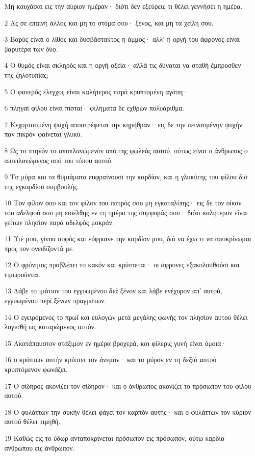 \par Μη καυχάσαι εις την αύριον ημέραν· διότι δεν εξεύρεις τι θέλει γεννήσει η ημέρα.
\par 2 Ας σε επαινή άλλος και μη το στόμα σου· ξένος, και μη τα χείλη σου.
\par 3 Βαρύς είναι ο λίθος και δυσβάστακτος η άμμος· αλλ' η οργή του άφρονος είναι βαρυτέρα των δύο.
\par 4 Ο θυμός είναι σκληρός και η οργή οξεία· αλλά τις δύναται να σταθή έμπροσθεν της ζηλοτυπίας;
\par 5 Ο φανερός έλεγχος είναι καλήτερος παρά κρυπτομένη αγάπη·
\par 6 πληγαί φίλου είναι πισταί· φιλήματα δε εχθρών πολυάριθμα.
\par 7 Κεχορτασμένη ψυχή αποστρέφεται την κηρήθραν· εις δε την πεινασμένην ψυχήν παν πικρόν φαίνεται γλυκύ.
\par 8 Ως το πτηνόν το αποπλανώμενόν από της φωλεάς αυτού, ούτως είναι ο άνθρωπος ο αποπλανώμενος από του τόπου αυτού.
\par 9 Τα μύρα και τα θυμιάματα ευφραίνουσι την καρδίαν, και η γλυκύτης του φίλου διά της εγκαρδίου συμβουλής.
\par 10 Τον φίλον σου και τον φίλον του πατρός σου μη εγκαταλίπης· εις δε τον οίκον του αδελφού σου μη εισέλθης εν τη ημέρα της συμφοράς σου· διότι καλήτερον είναι γείτων πλησίον παρά αδελφός μακράν.
\par 11 Υιέ μου, γίνου σοφός και εύφραινε την καρδίαν μου, διά να έχω τι να αποκρίνωμαι προς τον ονειδίζοντά με.
\par 12 Ο φρόνιμος προβλέπει το κακόν και κρύπτεται· οι άφρονες εξακολουθούσι και τιμωρούνται.
\par 13 Λάβε το ιμάτιον του εγγυωμένου διά ξένον και λάβε ενέχυρον απ' αυτού, εγγυωμένου περί ξένων πραγμάτων.
\par 14 Ο εγειρόμενος το πρωΐ και ευλογών μετά μεγάλης φωνής τον πλησίον αυτού θέλει λογισθή ως καταρώμενος αυτόν.
\par 15 Ακατάπαυστον στάξιμον εν ημέρα βροχερά, και φίλερις γυνή είναι όμοια·
\par 16 ο κρύπτων αυτήν κρύπτει τον άνεμον· και το μύρον εν τη δεξιά αυτού κρυπτόμενον φωνάζει.
\par 17 Ο σίδηρος ακονίζει τον σίδηρον· και ο άνθρωπος ακονίζει το πρόσωπον του φίλου αυτού.
\par 18 Ο φυλάττων την συκήν θέλει φάγει τον καρπόν αυτής· και ο φυλάττων τον κύριον αυτού θέλει τιμηθή.
\par 19 Καθώς εις το ύδωρ ανταποκρίνεται πρόσωπον εις πρόσωπον, ούτω καρδία ανθρώπου εις άνθρωπον.
